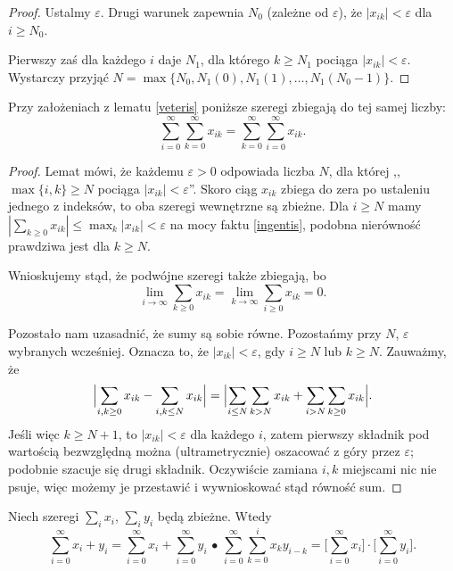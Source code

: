 \begin{proof}
	Ustalmy $\varepsilon$.
	Drugi warunek zapewnia $N_0$ (zależne od $\varepsilon$), że $|x_{ik}| < \varepsilon$ dla $i \ge N_0$.
	
	Pierwszy zaś dla każdego $i$ daje $N_1$, dla którego $k \ge N_1$ pociąga $|x_{ik}| < \varepsilon$.
	Wystarczy przyjąć $N = \max\{N_0, N_1(0), N_1(1), \ldots, N_1(N_0-1)\}$.
\end{proof}

\begin{fakt} \label{caedis}
	Przy założeniach z lematu \ref{veteris} poniższe szeregi zbiegają do tej samej liczby: \[\sum_{i = 0}^\infty \sum_{k = 0}^\infty x_{ik} = \sum_{k = 0}^\infty \sum_{i = 0}^\infty x_{ik}.\]
\end{fakt}

\begin{proof}
	Lemat mówi, że każdemu $\varepsilon > 0$ odpowiada liczba $N$, dla której ,,$\max \{i, k\} \ge N$ pociąga $|x_{ik}| < \varepsilon$''.
	Skoro ciąg $x_{ik}$ zbiega do zera po ustaleniu jednego z indeksów, to oba szeregi wewnętrzne są zbieżne.
	Dla $i \ge N$ mamy $|\sum_{k \ge 0} x_{ik}| \le \max_k |x_{ik}| < \varepsilon$ na mocy faktu \ref{ingentis}, podobna nierówność prawdziwa jest dla $k \ge N$.
	
	Wnioskujemy stąd, że podwójne szeregi także zbiegają, bo
	\[
		\lim_{i \to \infty} \sum_{k \ge 0} x_{ik} = \lim_{k \to \infty} \sum_{i \ge 0} x_{ik} = 0.
	\]

	Pozostało nam uzasadnić, że sumy są sobie równe.
	Pozostańmy przy $N$, $\varepsilon$ wybranych wcześniej.
	Oznacza to, że $|x_{ik}| < \varepsilon$, gdy $i \ge N$ lub $k \ge N$.
	Zauważmy, że 
	\[
		\Bigl|\sum_{i, k \ge 0} x_{ik} - \sum_{i, k \le N} x_{ik} \Bigr| = 
		\Bigl|\sum_{i \le N} \sum_{k > N} x_{ik} + \sum_{i > N} \sum_{k \ge 0} x_{ik} \Bigr|.
	\]
	Jeśli więc $k \ge N+1$, to $|x_{ik}| < \varepsilon$ dla każdego $i$, zatem pierwszy składnik pod wartością bezwzględną można (ultrametrycznie) oszacować z góry przez $\varepsilon$; podobnie szacuje się drugi składnik. Oczywiście zamiana $i, k$ miejscami nic nie psuje, więc możemy je przestawić i wywnioskować stąd równość sum.
\end{proof}

\begin{fakt}
	Niech szeregi $\sum_i x_i$, $\sum_i y_i$ będą zbieżne.
	Wtedy
	\[
		\sum_{i = 0}^\infty x_i + y_i = \sum_{i = 0}^\infty x_i + \sum_{i = 0}^\infty y_i \,\bullet\,
		\sum_{i = 0}^\infty \sum_{k = 0}^i x_k y_{i-k} = \Bigr[\sum_{i = 0}^\infty x_i\Bigr] \cdot \Bigr[ \sum_{i = 0}^\infty y_i\Bigr].
	\]
\end{fakt}

